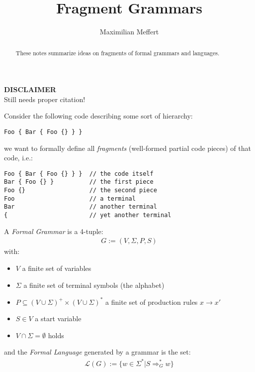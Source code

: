 \documentclass[runningheads,a4paper]{llncs}
\title{Fragment Grammars}
\author{Maximilian Meffert}
\institute{}
\begin{document}
\maketitle
\begin{center}
\textbf{DISCLAIMER}
\\Still needs proper citation!
\end{center}
\begin{abstract}
These notes summarize ideas on fragments of formal grammars and languages.
\end{abstract}
\noindent
Consider the following code describing some sort of hierarchy:
\begin{lstlisting}
Foo { Bar { Foo {} } }
\end{lstlisting}
we want to formally define all \textit{fragments} (well-formed partial code pieces) of that code, i.e.:
\begin{lstlisting}
Foo { Bar { Foo {} } }  // the code itself
Bar { Foo {} }          // the first piece
Foo {}                  // the second piece
Foo                     // a terminal
Bar                     // another terminal
{                       // yet another terminal
\end{lstlisting}

A \textit{Formal Grammar} is a 4-tuple:
\begin{align*}
G := (V,\Sigma,P,S)
\end{align*}
with:
\begin{itemize}
\item $V$ a finite set of variables
\item $\Sigma$ a finite set of terminal symbols (the alphabet)
\item $P \subseteq (V \cup \Sigma)^+ \times (V \cup \Sigma)^*$ a finite set of production rules $x \rightarrow x'$
\item $S \in V$ a start variable
\item $V \cap \Sigma = \emptyset$ holds
\end{itemize}
and the \textit{Formal Language} generated by a grammar is the set:
\begin{align*}
\mathcal{L}(G) := \{ w \in \Sigma^* | S \Rightarrow_G^* w \}
\end{align*}
\end{document}
